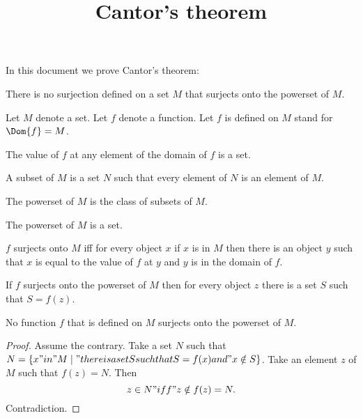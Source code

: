 \documentclass{article}
\title{Cantor's theorem}
\author{}
\date{}
\begin{document}

  \maketitle

  In this document we prove Cantor's theorem:

  \begin{quotedtheorem}
    There is no surjection defined on a set $M$ that surjects onto the powerset of $M$.
  \end{quotedtheorem}

  \begin{forthel}

    Let $M$ denote a set. Let $f$ denote a function.
    Let $f$ is defined on $M$ stand for $\Dom{f} = M$.

    \begin{axiom}
      The value of $f$ at any element of the domain of $f$ is a set.
    \end{axiom}

    \begin{definition}[Subset]
      A subset of $M$ is a set $N$ such that every element of $N$ is an element of $M$.
    \end{definition}

    \begin{definition}
      The powerset of $M$ is the class of subsets of $M$.
    \end{definition}

    \begin{axiom}
      The powerset of $M$ is a set.
    \end{axiom}

    \begin{definition}
      $f$ surjects onto $M$ iff
        for every object $x$ if $x$ is in $M$ then there is an object $y$ such that
          $x$ is equal to the value of $f$ at $y$ and $y$ is in the domain of $f$.
    \end{definition}

    \begin{lemma}
      If $f$ surjects onto the powerset of $M$ then for every object $z$ there is a set $S$
        such that $S = f(z)$.
    \end{lemma}

    \begin{theorem}[Cantor]
      No function $f$ that is defined on $M$ surjects onto the powerset of $M$.
    \end{theorem}
    \begin{proof}
      Assume the contrary.
      Take a set $N$ such that $N = \{ x "in" M \mid "there is a set S such that S = f(x) and" x \notin S \}$.
      Take an element $z$ of $M$ such that $f(z) = N$.
      Then $$z\in N "iff" z\notin f(z) = N.$$
      Contradiction.
    \end{proof}
  \end{forthel}
\end{document}
